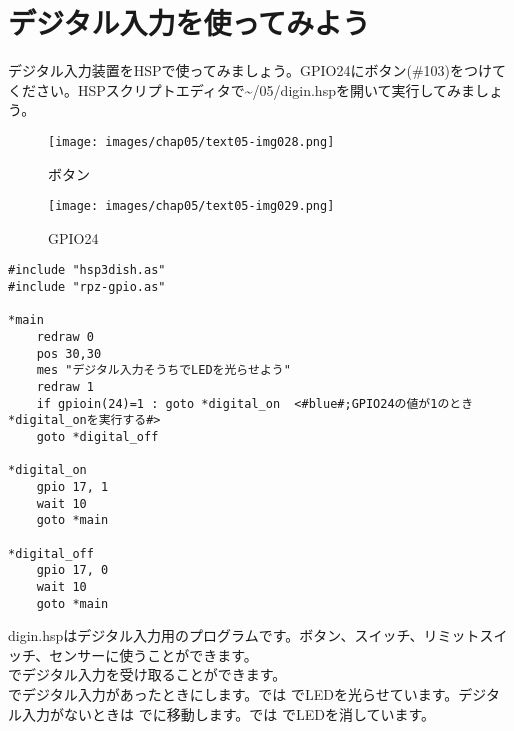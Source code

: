 \newpage
\section{デジタル入力を使ってみよう}
デジタル入力装置をHSPで使ってみましょう。GPIO24にボタン(\#103)をつけてください。HSPスクリプトエディタで\textasciitilde /05/digin.hspを開いて実行してみましょう。\\
\begin{figure}[H]
  \begin{minipage}[t]{0.3\columnwidth}
    \centering
 \texttt{[image: images/chap05/text05-img028.png]}
    \caption{ボタン}
  \end{minipage}
  \begin{minipage}[t]{0.5\columnwidth}
    \centering
    \texttt{[image: images/chap05/text05-img029.png]}
    \caption{GPIO24}
  \end{minipage}
\end{figure}

\begin{lstlisting}[caption=digin.hsp,label=digin.hsp]
#include "hsp3dish.as"
#include "rpz-gpio.as"

*main
	redraw 0
	pos 30,30
	mes "デジタル入力そうちでLEDを光らせよう"
	redraw 1
	if gpioin(24)=1 : goto *digital_on	<#blue#;GPIO24の値が1のとき*digital_onを実行する#>
	goto *digital_off
        
*digital_on
	gpio 17, 1
	wait 10
	goto *main

*digital_off
	gpio 17, 0
	wait 10
	goto *main
\end{lstlisting}

digin.hspはデジタル入力用のプログラムです。ボタン、スイッチ、リミットスイッチ、センサーに使うことができます。\\

でデジタル入力を受け取ることができます。\\

でデジタル入力があったときにします。では でLEDを光らせています。デジタル入力がないときは でに移動します。では でLEDを消しています。

\begin{tcolorbox}[title=\useOmetoi]
\begin{enumerate}
\end{enumerate}
\end{tcolorbox}

